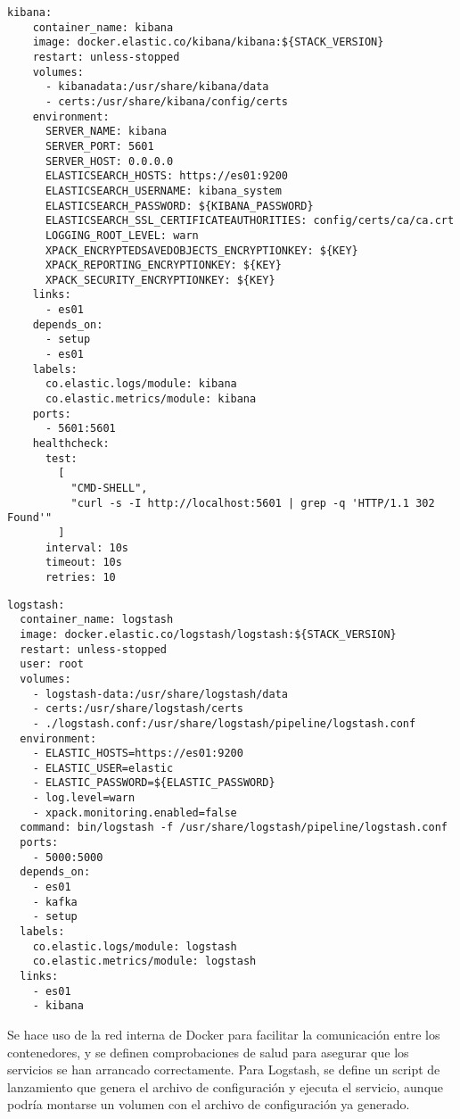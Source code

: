 \begin{lstlisting}[style=yaml, caption={Definición de los servicios de Kibana}]
kibana:
    container_name: kibana
    image: docker.elastic.co/kibana/kibana:${STACK_VERSION}
    restart: unless-stopped
    volumes:
      - kibanadata:/usr/share/kibana/data
      - certs:/usr/share/kibana/config/certs
    environment:
      SERVER_NAME: kibana
      SERVER_PORT: 5601
      SERVER_HOST: 0.0.0.0
      ELASTICSEARCH_HOSTS: https://es01:9200
      ELASTICSEARCH_USERNAME: kibana_system
      ELASTICSEARCH_PASSWORD: ${KIBANA_PASSWORD}
      ELASTICSEARCH_SSL_CERTIFICATEAUTHORITIES: config/certs/ca/ca.crt
      LOGGING_ROOT_LEVEL: warn
      XPACK_ENCRYPTEDSAVEDOBJECTS_ENCRYPTIONKEY: ${KEY}
      XPACK_REPORTING_ENCRYPTIONKEY: ${KEY}
      XPACK_SECURITY_ENCRYPTIONKEY: ${KEY}
    links:
      - es01
    depends_on:
      - setup
      - es01
    labels:
      co.elastic.logs/module: kibana
      co.elastic.metrics/module: kibana
    ports:
      - 5601:5601
    healthcheck:
      test:
        [
          "CMD-SHELL",
          "curl -s -I http://localhost:5601 | grep -q 'HTTP/1.1 302 Found'"
        ]
      interval: 10s
      timeout: 10s
      retries: 10
\end{lstlisting}

\begin{lstlisting}[style=yaml, caption={Definición de los servicios de Logstash}]
logstash:
  container_name: logstash
  image: docker.elastic.co/logstash/logstash:${STACK_VERSION}
  restart: unless-stopped
  user: root
  volumes:
    - logstash-data:/usr/share/logstash/data
    - certs:/usr/share/logstash/certs
    - ./logstash.conf:/usr/share/logstash/pipeline/logstash.conf
  environment:
    - ELASTIC_HOSTS=https://es01:9200
    - ELASTIC_USER=elastic
    - ELASTIC_PASSWORD=${ELASTIC_PASSWORD}
    - log.level=warn
    - xpack.monitoring.enabled=false
  command: bin/logstash -f /usr/share/logstash/pipeline/logstash.conf
  ports:
    - 5000:5000
  depends_on:
    - es01
    - kafka
    - setup
  labels:
    co.elastic.logs/module: logstash
    co.elastic.metrics/module: logstash
  links:
    - es01
    - kibana
\end{lstlisting}

Se hace uso de la red interna de Docker para facilitar la comunicación entre los
contenedores, y se definen comprobaciones de salud para asegurar que los
servicios se han arrancado correctamente. Para Logstash, se define un script de
lanzamiento que genera el archivo de configuración y ejecuta el servicio, aunque
podría montarse un volumen con el archivo de configuración ya generado.


